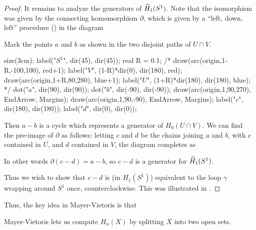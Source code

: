 \begin{proof}
	It remains to analyze the generators of $\widetilde H_1(S^1)$.
	Note that the isomorphism was given by the connecting homomorphism $\partial$,
	which is given by a ``left, down, left'' procedure ()
	in the diagram
	\begin{center}
	\end{center}
	Mark the points $a$ and $b$ as shown in the two disjoint paths of $U \cap V$.
	\begin{center}
		\begin{asy}
			size(3cm);
			label("$S^1$", dir(45), dir(45));
			real R = 0.1;
			/*
			draw(arc(origin,1-R,-100,100), red+1);
			label("$V$", (1-R)*dir(0), dir(180), red);
			draw(arc(origin,1+R,80,280), blue+1);
			label("$U$", (1+R)*dir(180), dir(180), blue);
			*/
			dot("$a$", dir(90), dir(90));
			dot("$b$", dir(-90), dir(-90));
			draw(arc(origin,1,90,270), EndArrow, Margins);
			draw(arc(origin,1,90,-90), EndArrow, Margins);
			label("$c$", dir(180), dir(180));
			label("$d$", dir(0), dir(0));
		\end{asy}
	\end{center}
	Then $a-b$ is a cycle which represents a generator of $H_0(U \cap V)$.
	We can find the pre-image of $\partial$ as follows:
	letting $c$ and $d$ be the chains joining $a$ and $b$, with $c$ contained
	in $U$, and $d$ contained in $V$, the diagram completes as
	\begin{center}
	\end{center}
	In other words $\partial(c-d) = a-b$, so $c-d$ is a generator for $\widetilde H_1(S^1)$.

	Thus we wish to show that $c-d$ is (in $H_1(S^1)$) equivalent to the loop $\gamma$
	wrapping around $S^1$ once, counterclockwise.
	This was illustrated in .
\end{proof}

Thus, the key idea in Mayer-Vietoris is that
\begin{moral}
	Mayer-Vietoris lets us compute $H_n(X)$
	by splitting $X$ into two open sets.
\end{moral}

